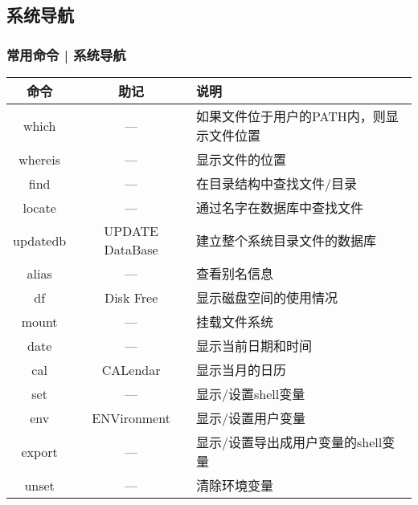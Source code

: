 \subsection{系统导航}
\begin{frame}
  \frametitle{常用命令 | \alert{系统导航}}
  \begin{table}
    \centering
    \begin{tabularx}{\textwidth}{ccX}
      \hline
      \rowcolor{blue!50}命令 & 助记 & 说明\\
      \hline
      which & --- & \scriptsize{如果文件位于用户的PATH内，则显示文件位置}\\
      whereis & --- & 显示文件的位置\\
      find & --- & 在目录结构中查找文件/目录\\
      locate & --- & 通过名字在数据库中查找文件\\
      updatedb & UPDATE DataBase & 建立整个系统目录文件的数据库\\
      alias & --- & 查看别名信息\\
      df & Disk Free & 显示磁盘空间的使用情况\\
      mount & --- & 挂载文件系统\\
      date & --- & 显示当前日期和时间\\
      cal & CALendar & 显示当月的日历\\
      \hline
      set & --- & 显示/设置shell变量\\
      env & ENVironment & 显示/设置用户变量\\
      export & --- & \footnotesize{显示/设置导出成用户变量的shell变量}\\
      unset & --- & 清除环境变量\\
      \hline
    \end{tabularx}
  \end{table}
\end{frame}


